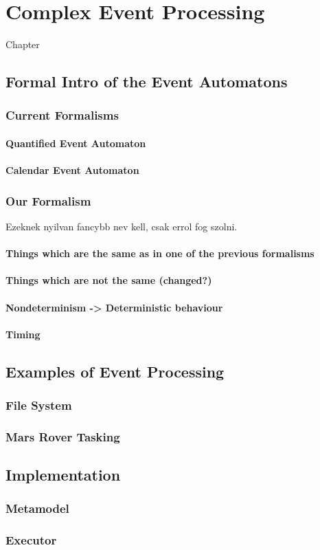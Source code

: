 \chapter{Complex Event Processing}
\label{chap:cep}

Chapter
\section{Formal Intro of the Event Automatons}
	\subsection{Current Formalisms}
		\subsubsection{Quantified Event Automaton}
		\subsubsection{Calendar Event Automaton}
	\subsection{Our Formalism}
Ezeknek nyilvan fancybb nev kell, csak errol fog szolni.
		\subsubsection{Things which are the same as in one of the previous formalisms}
		\subsubsection{Things which are not the same (changed?)}
		\subsubsection{Nondeterminism -> Deterministic behaviour}
		\subsubsection{Timing}
\section{Examples of Event Processing}
	\subsection{File System}
	\subsection{Mars Rover Tasking}

\section{Implementation}
	\subsection{Metamodel}
	\subsection{Executor}
